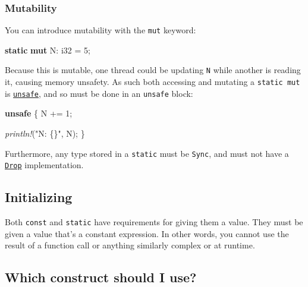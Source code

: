 \documentclass[a4paper,]{book}
\newenvironment{Shaded}{\begin{snugshade}}{\end{snugshade}}
\newcommand{\KeywordTok}[1]{\textcolor[rgb]{0.13,0.29,0.53}{\textbf{{#1}}}}
\newcommand{\DataTypeTok}[1]{\textcolor[rgb]{0.13,0.29,0.53}{{#1}}}
\newcommand{\DecValTok}[1]{\textcolor[rgb]{0.00,0.00,0.81}{{#1}}}
\newcommand{\StringTok}[1]{\textcolor[rgb]{0.31,0.60,0.02}{{#1}}}
\newcommand{\PreprocessorTok}[1]{\textcolor[rgb]{0.56,0.35,0.01}{\textit{{#1}}}}
\newcommand{\NormalTok}[1]{{#1}}
\begin{document}
\hypertarget{mutability-1}{\subsubsection{Mutability}\label{mutability-1}}

You can introduce mutability with the \texttt{mut} keyword:

\begin{Shaded}
\begin{Highlighting}[]
\KeywordTok{static} \KeywordTok{mut} \NormalTok{N: }\DataTypeTok{i32} \NormalTok{= }\DecValTok{5}\NormalTok{;}
\end{Highlighting}
\end{Shaded}

Because this is mutable, one thread could be updating \texttt{N} while
another is reading it, causing memory unsafety. As such both accessing
and mutating a \texttt{static\ mut} is
\protect\hyperlink{sec--unsafe}{\texttt{unsafe}}, and so must be done in
an \texttt{unsafe} block:

\begin{Shaded}
\begin{Highlighting}[]

\KeywordTok{unsafe} \NormalTok{\{}
    \NormalTok{N += }\DecValTok{1}\NormalTok{;}

    \PreprocessorTok{println!}\NormalTok{(}\StringTok{"N: \{\}"}\NormalTok{, N);}
\NormalTok{\}}
\end{Highlighting}
\end{Shaded}

Furthermore, any type stored in a \texttt{static} must be \texttt{Sync},
and must not have a \protect\hyperlink{sec--drop}{\texttt{Drop}}
implementation.

\subsection{Initializing}\label{initializing}

Both \texttt{const} and \texttt{static} have requirements for giving
them a value. They must be given a value that's a constant expression.
In other words, you cannot use the result of a function call or anything
similarly complex or at runtime.

\subsection{Which construct should I
use?}\label{which-construct-should-i-use}
\end{document}

